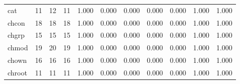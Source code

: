 \begin{longtable}{lp{1.2cm}p{1.2cm}p{1.2cm}p{1.2cm}p{1.2cm}p{1.2cm}p{1.2cm}p{1.2cm}p{1.2cm}p{1.2cm}}
cat       &                           11 &                 12 &                                11 &                                      1.000 &                                  0.000 &                                        0.000 &                             0.000 &                                   0.000 &                              1.000 &                                              1.000 \\
chcon     &                           18 &                 18 &                                18 &                                      1.000 &                                  0.000 &                                        0.000 &                             0.000 &                                   0.000 &                              1.000 &                                              1.000 \\
chgrp     &                           15 &                 15 &                                15 &                                      1.000 &                                  0.000 &                                        0.000 &                             0.000 &                                   0.000 &                              1.000 &                                              1.000 \\
chmod     &                           19 &                 20 &                                19 &                                      1.000 &                                  0.000 &                                        0.000 &                             0.000 &                                   0.000 &                              1.000 &                                              1.000 \\
chown     &                           16 &                 16 &                                16 &                                      1.000 &                                  0.000 &                                        0.000 &                             0.000 &                                   0.000 &                              1.000 &                                              1.000 \\
chroot    &                           11 &                 11 &                                11 &                                      1.000 &                                  0.000 &                                        0.000 &                             0.000 &                                   0.000 &                              1.000 &                                              1.000 \\

\end{longtable}
